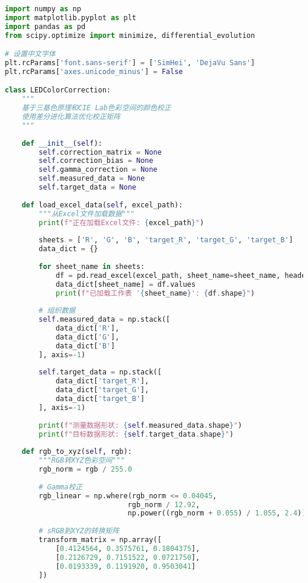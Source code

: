 \begin{lstlisting}[language=Python]
import numpy as np
import matplotlib.pyplot as plt
import pandas as pd
from scipy.optimize import minimize, differential_evolution

# 设置中文字体
plt.rcParams['font.sans-serif'] = ['SimHei', 'DejaVu Sans']
plt.rcParams['axes.unicode_minus'] = False

class LEDColorCorrection:
    """
    基于三基色原理和CIE Lab色彩空间的颜色校正
    使用差分进化算法优化校正矩阵
    """
    
    def __init__(self):
        self.correction_matrix = None
        self.correction_bias = None
        self.gamma_correction = None
        self.measured_data = None
        self.target_data = None
        
    def load_excel_data(self, excel_path):
        """从Excel文件加载数据"""
        print(f"正在加载Excel文件: {excel_path}")
        
        sheets = ['R', 'G', 'B', 'target_R', 'target_G', 'target_B']
        data_dict = {}
        
        for sheet_name in sheets:
            df = pd.read_excel(excel_path, sheet_name=sheet_name, header=None).iloc[0:64,0:64]
            data_dict[sheet_name] = df.values
            print(f"已加载工作表 '{sheet_name}': {df.shape}")
        
        # 组织数据
        self.measured_data = np.stack([
            data_dict['R'],
            data_dict['G'], 
            data_dict['B']
        ], axis=-1)
        
        self.target_data = np.stack([
            data_dict['target_R'],
            data_dict['target_G'],
            data_dict['target_B']
        ], axis=-1)
        
        print(f"测量数据形状: {self.measured_data.shape}")
        print(f"目标数据形状: {self.target_data.shape}")
    
    def rgb_to_xyz(self, rgb):
        """RGB转XYZ色彩空间"""
        rgb_norm = rgb / 255.0
        
        # Gamma校正
        rgb_linear = np.where(rgb_norm <= 0.04045,
                             rgb_norm / 12.92,
                             np.power((rgb_norm + 0.055) / 1.055, 2.4))
        
        # sRGB到XYZ的转换矩阵
        transform_matrix = np.array([
            [0.4124564, 0.3575761, 0.1804375],
            [0.2126729, 0.7151522, 0.0721750],
            [0.0193339, 0.1191920, 0.9503041]
        ])
        

\end{lstlisting}
